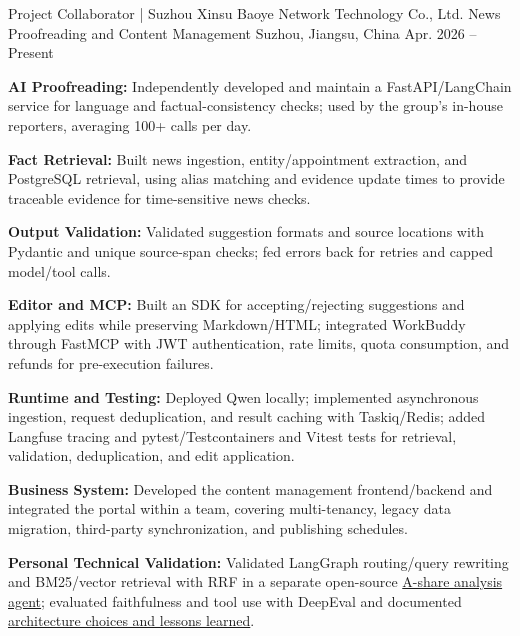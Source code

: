 

\begin{cventries}
\cventry
  {Project Collaborator | Suzhou Xinsu Baoye Network Technology Co., Ltd.} %
  {News Proofreading and Content Management} %
  {Suzhou, Jiangsu, China} %
  {Apr. 2026 -- Present} %
  {
    \begin{cvitems}
      \item {\textbf{AI Proofreading:} Independently developed and maintain a FastAPI/LangChain service for language and factual-consistency checks; used by the group's in-house reporters, averaging 100+ calls per day.}
      \item {\textbf{Fact Retrieval:} Built news ingestion, entity/appointment extraction, and PostgreSQL retrieval, using alias matching and evidence update times to provide traceable evidence for time-sensitive news checks.}
      \item {\textbf{Output Validation:} Validated suggestion formats and source locations with Pydantic and unique source-span checks; fed errors back for retries and capped model/tool calls.}
      \item {\textbf{Editor and MCP:} Built an SDK for accepting/rejecting suggestions and applying edits while preserving Markdown/HTML; integrated WorkBuddy through FastMCP with JWT authentication, rate limits, quota consumption, and refunds for pre-execution failures.}
      \item {\textbf{Runtime and Testing:} Deployed Qwen locally; implemented asynchronous ingestion, request deduplication, and result caching with Taskiq/Redis; added Langfuse tracing and pytest/Testcontainers and Vitest tests for retrieval, validation, deduplication, and edit application.}
      \item {\textbf{Business System:} Developed the content management frontend/backend and integrated the portal within a team, covering multi-tenancy, legacy data migration, third-party synchronization, and publishing schedules.}
      \item {\textbf{Personal Technical Validation:} Validated LangGraph routing/query rewriting and BM25/vector retrieval with RRF in a separate open-source \href{https://github.com/FreeFlyingSheep/stock-analysis}{A-share analysis agent}; evaluated faithfulness and tool use with DeepEval and documented \href{https://freeflyingsheep.github.io/posts/ai/agent/demo/}{architecture choices and lessons learned}.}
    \end{cvitems}
  }


\end{cventries}
